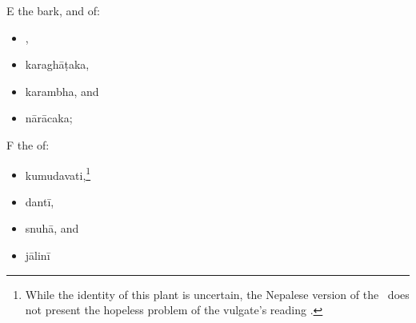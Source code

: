 \begin{translation}
        \item[E]
        the bark,  and  of:
\begin{itemize}
        \item {},
        \item \gls{karaghāṭaka},
        \item \gls{karambha},
        and
        \item \gls{nārācaka};
            \end{itemize}
 
        \item[F]
        the   of:
              \begin{itemize}
        \item \gls{kumudavati},\footnote{While the identity of this plant is 
            uncertain, the Nepalese version of the \SS\ does not present the 
            hopeless problem of the vulgate's reading .}
%
\item \gls{dantī},
\item \gls{snuhā},
and
\item \gls{jālinī}        
            \end{itemize}


\end{translation}
